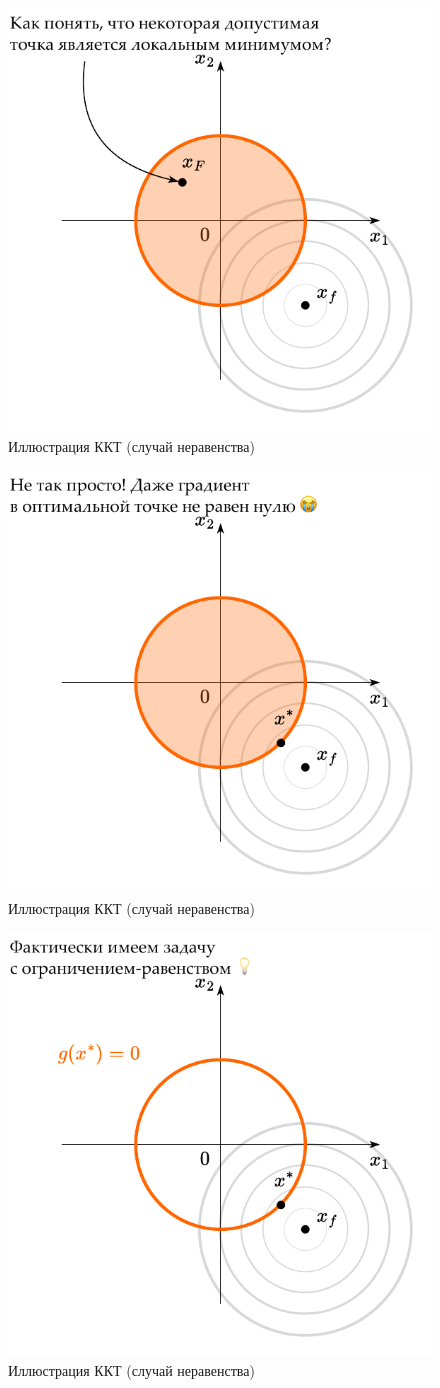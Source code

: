 \documentclass[
  russian,
  letterpaper,
  DIV=11,
  numbers=noendperiod]{scrartcl}
\begin{document}
\begin{figure}[H]

{\centering \includegraphics[width=0.5\linewidth,height=\textheight,keepaspectratio]{ineq_constr_7_ru.pdf}

}

\caption{Иллюстрация ККТ (случай неравенства)}

\end{figure}%

\begin{figure}[H]

{\centering \includegraphics[width=0.5\linewidth,height=\textheight,keepaspectratio]{ineq_constr_8_ru.pdf}

}

\caption{Иллюстрация ККТ (случай неравенства)}

\end{figure}%

\begin{figure}[H]

{\centering \includegraphics[width=0.5\linewidth,height=\textheight,keepaspectratio]{ineq_constr_9_ru.pdf}

}

\caption{Иллюстрация ККТ (случай неравенства)}

\end{figure}%
\end{document}
